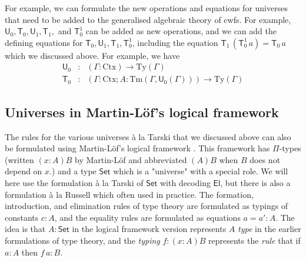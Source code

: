 \documentclass[11pt,a4paper]{article}
\def\UU{\mathsf{U}}
\newcommand{\Set}{\mathsf{Set}}
\newcommand{\El}{\mathsf{El}}
\newcommand{\T}{\mathsf{T}}
\def\Ctx{\mathrm{Ctx}}
\def\Ty{\mathrm{Ty}}
\def\Tm{\mathrm{Tm}}
\begin{document}
For example, we can formulate the new operations and equations for universes that need to be added to the generalised algebraic theory of cwfs. For example, $\UU_0,\T_0,\UU_1, \T_1,$ and $\T_0^1$ can be added as new operations, and we can add the defining equations for $\T_0,\UU_1, \T_1,\T_0^1$, including the equation
$
\T_1\, (\T_0^1\, a) = \T_0\, a
$
which we discussed above.
For example, we have
\begin{eqnarray*}
\UU_0 &: &(\Gamma : \Ctx) \to \Ty(\Gamma)\\
\T_0 &: &(\Gamma : \Ctx ; A : \Tm(\Gamma,\UU_0(\Gamma)))\to \Ty(\Gamma)
\end{eqnarray*}

\subsection{Universes in Martin-Löf's logical framework}

The rules for the various universes \`a la Tarski that we discussed above can also be formulated using Martin-Löf's logical framework \cite{Martinlof86,NordstromPS90}. This framework has $\Pi$-types (written $(x : A)B$ by Martin-Löf and abbreviated $(A)B$ when $B$ does not depend on $x$.) and a type $\Set$ which is a "universe" with a special role. We will here use the formulation \`a la Tarski of $\Set$ with decoding $\El$, but there is also a formulation \`a la Russell which often used in practice. The formation, introduction, and elimination rules of type theory are formulated as typings of constants $c : A$, and the equality rules are formulated as equations $a = a' : A$. The idea is that $A : \Set$ in the logical framework version represents $A$ {\em type} in the earlier formulations of type theory, and the {\em typing} $f : (x : A)B$ represents the {\em rule} that if $a : A$ then $f\,a : B$.
\end{document}
